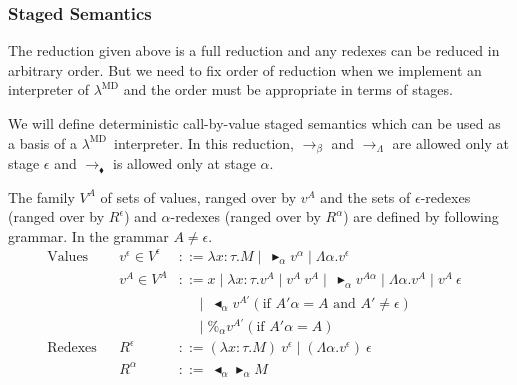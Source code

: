 \documentclass[runningheads]{llncs}
\newcommand{\LMD}{$\lambda^{\textrm{MD}}$\xspace}
\newcommand{\TB}{{\mathop{\blacktriangleright}}}
\newcommand{\TBL}{{\mathop{\blacktriangleleft}}}
\begin{document}
  \subsubsection{Staged Semantics}

  The reduction given above is a full reduction and any redexes can be reduced in arbitrary order.
  But we need to fix order of reduction when we implement an interpreter of \LMD and
  the order must be appropriate in terms of stages.

  We will define deterministic call-by-value staged semantics which can be used as a basis of a \LMD\ interpreter.
  In this reduction, $\longrightarrow_\beta$ and $\longrightarrow_\Lambda$ are allowed only at stage $\epsilon$ and 
  $\longrightarrow_\blacklozenge$ is allowed only at stage $\alpha$.

  \begin{definition}[Values]
      The family $V^A$ of sets of values, ranged over by $v^A$ and 
      the sets of $\epsilon$-redexes (ranged over by $R^\epsilon$) and $\alpha$-redexes (ranged over by $R^\alpha$)
      are defined by following grammar. In the grammar $A \neq \epsilon$.
      \begin{align*}
          \textrm{Values}  &   & v^\epsilon \in V^\epsilon & ::= \lambda x:\tau.M \mid\ \TB_\alpha v^\alpha \mid \Lambda\alpha.v^\epsilon                                       &   \\
                           &   & v^A \in V^A               & ::= x \mid \lambda x:\tau.v^A \mid v^A\ v^A \mid\ \TB_\alpha v^{A\alpha} \mid \Lambda\alpha.v^A \mid v^A\ \epsilon &   \\
                           &   &                           & \quad\   \mid\ \TBL_\alpha v^{A'} (\text{if } A'\alpha = A \text{ and } A' \neq \epsilon)                          &   \\
                           &   &                           & \quad\   \mid \%_\alpha v^{A'} (\text{if } A'\alpha = A)                                                           &   \\
          \textrm{Redexes} &   & R^\epsilon                & ::= (\lambda x:\tau.M)\ v^\epsilon \mid (\Lambda\alpha.v^\epsilon)\ \epsilon                                       &   \\
                           &   & R^\alpha                  & ::=\ \TBL_\alpha \TB_\alpha M                                                                                      &   \\
      \end{align*}
  \end{definition}
\end{document}
